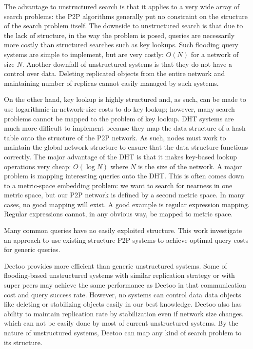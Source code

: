 \documentclass[conference]{IEEEtran}
\begin{document}
The advantage to unstructured search is that it applies to a very wide array of 
search problems: the P2P algorithms generally put no constraint on 
the structure of the search problem itself. The downside to unstructured search is 
that due to the lack of structure, in the way the problem is posed, queries are 
necessarily more costly than structured searches such as key lookups.
Such flooding query systems are simple to implement, but
are very costly: $O(N)$ for a network of size $N$.
Another downfall of unstructured systems is that they do not have a control over 
data. Deleting replicated objects from the entire network and maintaining
number of replicas cannot easily managed by such systems.

On the other hand, key lookup is highly structured and, as such, can be made to use 
logarithmic-in-network-size costs to do key lookup; however, 
many search problems cannot be mapped to the problem of key lookup.
DHT systems are much more difficult
to implement because they map the data structure of a hash table onto the structure of the P2P network. 
As such, nodes must work to maintain the global network structure to ensure that 
the data structure functions correctly.
The major advantage of the DHT is that it makes key-based lookup operations 
very cheap: $O(\log{N})$ where $N$ is the size of the network.
A major problem is mapping interesting queries onto the DHT. This is often comes down to a metric-space
embedding problem: we want to search for nearness in one metric space, but our
P2P network is defined by a second metric space. 
In many cases, no good mapping will exist. A good example is regular expression mapping. 
Regular expressions cannot, in any obvious way, be mapped to metric space.

Many common queries have no easily exploited structure. 
This work investigate an approach to use existing structure P2P systems to achieve optimal query
costs for generic queries.
\fi

Deetoo provides more efficient than generic unstructured systems.  
Some of flooding-based unstructured systems with similar replication strategy or with super peers 
may achieve the same performance as Deetoo in that communication cost and query success rate. 
However, no systems can control data data objects like deleting or stabilizing objects easily in our best knowledge.
Deetoo also has ability to maintain replication rate by stabilization even if network size changes.
which can not be easily done by most of current unstructured systems.
By the nature of unstructured systems, Deetoo can map any kind of search problem to its structure.
\end{document}
